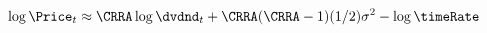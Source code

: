 \begin{equation}\begin{gathered}\begin{aligned}
  \log \Price_{t} & \approx  \CRRA \log \dvdnd_{t} + \CRRA(\CRRA-1)(1/2)\sigma^{2} - \log \timeRate \label{eq:PtLogIID}
\end{aligned}\end{gathered}\end{equation}

